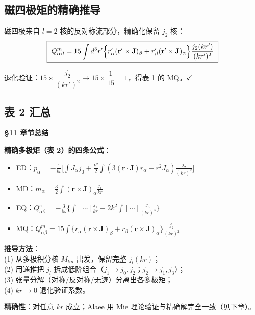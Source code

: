 \subsection{磁四极矩的精确推导}

磁四极来自 $l=2$ 核的反对称流部分，精确化保留 $j_2$ 核：
\begin{equation}
  \boxed{\;
  Q^m_{\alpha\beta} = 15\int d^3r'\Bigl\{
    r'_\alpha(\mathbf{r}'\times\mathbf{J})_\beta + r'_\beta(\mathbf{r}'\times\mathbf{J})_\alpha
  \Bigr\}\frac{j_2(kr')}{(kr')^2}
  \;}
  \label{eq:Qm_exact2}
\end{equation}

退化验证：$15\times\dfrac{j_2}{(kr')^2}\to15\times\dfrac{1}{15}=1$，得表 1 的 MQ。$\checkmark$

\subsection{表 2 汇总}

\begin{chaptersummary}

\textbf{\S11 章节总结}

\textbf{精确多极矩（表 2）的四条公式}：
\begin{itemize}
  \item ED：$p_\alpha = -\frac{1}{i\omega}\bigl[\int J_\alpha j_0 + \frac{k^2}{2}\int(3(\mathbf{r}\cdot\mathbf{J})r_\alpha - r^2J_\alpha)\frac{j_2}{(kr)^2}\bigr]$
  \item MD：$m_\alpha = \frac32\int(\mathbf{r}\times\mathbf{J})_\alpha\frac{j_1}{kr}$
  \item EQ：$Q^e_{\alpha\beta} = -\frac{3}{i\omega}\{\int[\cdots]\frac{j_1}{kr} + 2k^2\int[\cdots]\frac{j_3}{(kr)^3}\}$
  \item MQ：$Q^m_{\alpha\beta} = 15\int\{r_\alpha(\mathbf{r}\times\mathbf{J})_\beta + r_\beta(\mathbf{r}\times\mathbf{J})_\alpha\}\frac{j_2}{(kr)^2}$
\end{itemize}

\textbf{推导方法}：\\
(1) 从多极积分核 $M_{lm}$ 出发，保留完整 $j_l(kr)$；\\
(2) 用递推把 $j_l$ 拆成低阶组合（$j_1\to j_0,j_2$；$j_2\to j_1,j_3$）；\\
(3) 张量分解（对称/反对称/无迹）分离出各多极矩；\\
(4) $kr\to0$ 退化验证系数。

\textbf{精确性}：对任意 $kr$ 成立；Alaee 用 Mie 理论验证与精确解完全一致（见下章）。

\end{chaptersummary}

\newpage

